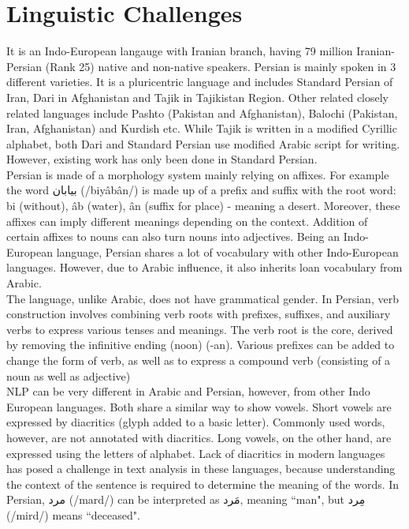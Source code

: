 \documentclass{article}
\begin{document}
	\section{Linguistic Challenges}
	It is an Indo-European langauge with Iranian branch, having 79 million Iranian-Persian (Rank 25) native and non-native speakers. \cite{wikitotalspeakers} 
	Persian is mainly spoken in 3 different varieties. It is a pluricentric language and includes Standard Persian of Iran, Dari in Afghanistan and Tajik in Tajikistan Region. Other related closely related languages include Pashto (Pakistan and Afghanistan), Balochi (Pakistan, Iran, Afghanistan) and Kurdish etc.
	While Tajik is written in a modified Cyrillic alphabet, both Dari and Standard Persian use modified Arabic script for writing. However, existing work has only been done in Standard Persian. \\
	Persian is made of a morphology system mainly relying on affixes. For example the word \textfarsi{بیابان} (/biyâbân/) is made up of a prefix and suffix with the root word: bi (without), âb (water), ân (suffix for place) - meaning a desert. Moreover, these affixes can imply different meanings depending on the context. Addition of certain affixes to nouns can also turn nouns into adjectives. Being an Indo-European language, Persian shares a lot of vocabulary with other Indo-European languages. However, due to Arabic influence, it also inherits loan vocabulary from Arabic. \\
	The language, unlike Arabic, does not have grammatical gender.
	In Persian, verb construction involves combining verb roots with prefixes, suffixes, and auxiliary verbs to express various tenses and meanings. The verb root is the core, derived by removing the infinitive ending (noon) (-an). Various prefixes can be added to change the form of verb, as well as to express a compound verb (consisting of a noun as well as adjective)
	\\
	NLP can be very different in Arabic and Persian, however, from other Indo European languages. Both share a similar way to show vowels. Short vowels are expressed by diacritics (glyph added to a basic letter). Commonly used words, however, are not annotated with diacritics. Long vowels, on the other hand, are expressed using the letters of alphabet. Lack of diacritics in modern languages has posed a challenge in text analysis in these languages, because understanding the context of the sentence is required to determine the meaning of the words. In Persian, \textfarsi{مرد} (/mard/) can be interpreted as \textfarsi{مَرد}, meaning
	``man", but \textfarsi{مِرد} (/mird/) means ``deceased".
	
\end{document}
